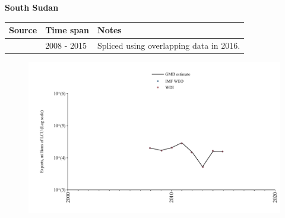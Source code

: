 \documentclass[12pt,a4paper,landscape]{article}
\begin{document}
\begin{adjustbox}{max totalsize={\paperwidth}{\paperheight},center}
\begin{minipage}[t][\textheight][t]{\textwidth}
\vspace*{0.5cm}
{}
\begin{center}
{\Large\bfseries South Sudan}
\end{center}
\vspace{0.5cm}
\begin{table}[H]
\centering
\small
\begin{tabular}{|l|l|l|}
\hline
\textbf{Source} & \textbf{Time span} & \textbf{Notes} \\
\hline
\rowcolor{white}\cite{WDI}& 2008 - 2015 &Spliced using overlapping data in 2016.\\
\hline
\end{tabular}
\end{table}
\begin{figure}[H]
\centering
\includegraphics[width=\textwidth,height=0.6\textheight,keepaspectratio]{graphs/SSD_exports.pdf}
\end{figure}
\end{minipage}
\end{adjustbox}
\end{document}
